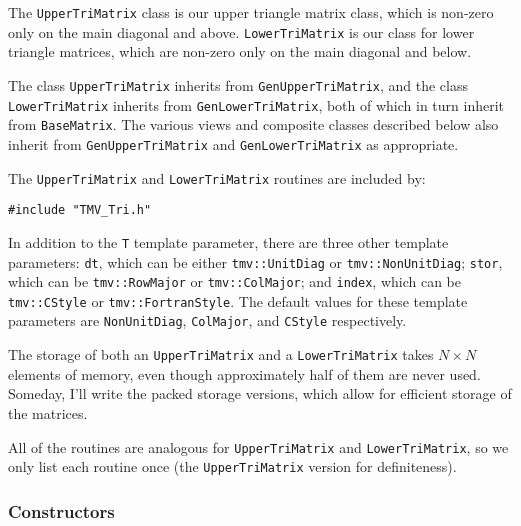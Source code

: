 \documentclass[twoside,letterpaper,11pt]{article}
\renewcommand{\tt}[1]{{\texttt {#1}}}
\begin{document}
The \tt{UpperTriMatrix} class is our upper triangle matrix class, which is non-zero
only on the main diagonal and above.  \tt{LowerTriMatrix} is our class for lower
triangle matrices, which are non-zero only on the main diagonal and below.

The class \tt{UpperTriMatrix} inherits from \tt{GenUpperTriMatrix}, 
and the class \tt{LowerTriMatrix}
inherits from \tt{GenLowerTriMatrix}, both of
which in turn inherit from \tt{BaseMatrix}.  
The various views and composite classes described below
also inherit from \tt{GenUpperTriMatrix} and \tt{GenLowerTriMatrix} 
as appropriate.

The \tt{UpperTriMatrix} and \tt{LowerTriMatrix} routines are included by:
\begin{verbatim}
#include "TMV_Tri.h"
\end{verbatim}

In addition to the \tt{T} template parameter, there are three other template 
parameters:
\tt{dt}, which can be either \tt{tmv::UnitDiag} or \tt{tmv::NonUnitDiag};
\tt{stor}, which can be \tt{tmv::RowMajor} or \tt{tmv::ColMajor};
and \tt{index}, which can be \tt{tmv::CStyle} or \tt{tmv::FortranStyle}.
The default values for these template parameters are 
\tt{NonUnitDiag}, \tt{ColMajor}, and \tt{CStyle} respectively.

The storage of both an \tt{UpperTriMatrix} and a \tt{LowerTriMatrix} takes
$N \times N$ elements of memory, even though approximately half of them 
are never used.  Someday, I'll write the packed storage versions, which allow for
efficient storage of the matrices.

All of the routines are analogous for \tt{UpperTriMatrix} and 
\tt{LowerTriMatrix}, so we only list each routine once 
(the \tt{UpperTriMatrix} version for
definiteness).  

\subsubsection{Constructors}
\end{document}

